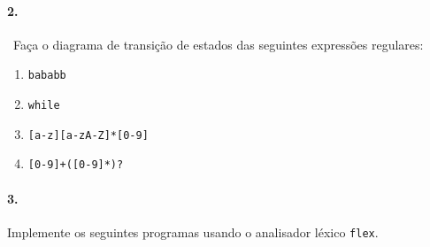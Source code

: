 \paragraph{2.}~Faça o diagrama de transição de estados das seguintes expressões
regulares:

\begin{enumerate}
  \item {\tt bababb}
  \item {\tt while}
  \item {\tt [a-z][a-zA-Z]*[0-9]}
  \item {\tt [0-9]+(\.[0-9]*)?}
\end{enumerate}

\paragraph{3.} Implemente os seguintes programas usando o analisador léxico {\tt flex}.

